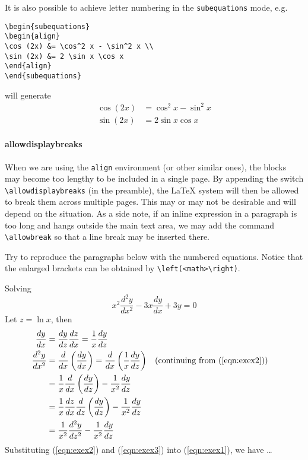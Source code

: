 It is also possible to achieve letter numbering in the \texttt{subequations} mode, e.g.\
\begin{lstlisting}
\begin{subequations}
\begin{align}
\cos (2x) &= \cos^2 x - \sin^2 x \\
\sin (2x) &= 2 \sin x \cos x
\end{align}
\end{subequations}
\end{lstlisting}
will generate
\begin{subequations}
\begin{align}
\cos (2x) &= \cos^2 x - \sin^2 x \\
\sin (2x) &= 2 \sin x \cos x
\end{align}
\end{subequations}

\paragraph{allowdisplaybreaks}
When we are using the \texttt{align} environment (or other similar ones), the blocks may become too lengthy to be included in a single page. By appending the switch \texttt{\textbackslash allowdisplaybreaks} (in the preamble), the \LaTeX{} system will then be allowed to break them across multiple pages. This may or may not be desirable and will depend on the situation. As a side note, if an inline expression in a paragraph is too long and hangs outside the main text area, we may add the command \texttt{\textbackslash allowbreak} so that a line break may be inserted there.

\begin{exercisebox}
\begin{Exercise}
Try to reproduce the paragraphs below with the numbered equations. Notice that the enlarged brackets can be obtained by \texttt{\textbackslash left(<math>\textbackslash right)}.

Solving
\begin{equation}
x^2\frac{d^2y}{dx^2} - 3x\frac{dy}{dx} + 3y = 0 \label{eqn:exex1}
\end{equation} 
Let $z = \ln x$, then
\begin{align}
\frac{dy}{dx} &= \frac{dy}{dz}\frac{dz}{dx} = \frac{1}{x}\frac{dy}{dz} \label{eqn:exex2} \\
\frac{d^2y}{dx^2} &= \frac{d}{dx}\left(\frac{dy}{dx}\right) = \frac{d}{dx}\left(\frac{1}{x}\frac{dy}{dz}\right) && (\text{continuing from (\ref{eqn:exex2})}) \nonumber \\
&= \frac{1}{x}\frac{d}{dx}\left(\frac{dy}{dz}\right) - \frac{1}{x^2}\frac{dy}{dz} \nonumber \\
&= \frac{1}{x}\frac{dz}{dx}\frac{d}{dz}\left(\frac{dy}{dz}\right) - \frac{1}{x^2}\frac{dy}{dz} \nonumber \\
&= \frac{1}{x^2}\frac{d^2y}{dz^2} - \frac{1}{x^2}\frac{dy}{dz} \label{eqn:exex3}
\end{align}
Substituting (\ref{eqn:exex2}) and (\ref{eqn:exex3}) into (\ref{eqn:exex1}), we have \ldots
\end{Exercise} 
\end{exercisebox}

